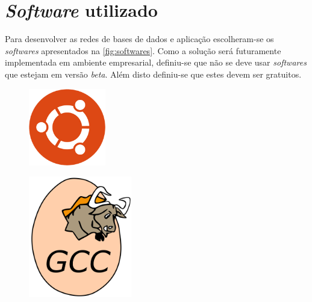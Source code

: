 \documentclass[11pt,twoside,a4paper]{report}
\begin{document}

\newpage
\section{\textit{Software} utilizado}
Para desenvolver as redes de bases de dados e aplicação escolheram-se os \textit{softwares} apresentados na \autoref{fig:softwares}. Como a solução será futuramente implementada em ambiente empresarial, definiu-se que não se deve usar \textit{softwares} que estejam em versão \textit{beta}. Além disto definiu-se que estes devem ser gratuitos.
\begin{figure}[H]
	\centering
	\begin{minipage}{0.33\textwidth}
		\vspace{0.88cm}
		\begin{center}
			\includegraphics[width=0.3\textwidth]{ubuntu} %
			\label{fig:linux}
		\end{center}
	\end{minipage}%
	\begin{minipage}{0.33\textwidth}
		\begin{center}
			\includegraphics[width=0.4\textwidth]{gcc} %
			\label{fig:gcc}
		\end{center}

\end{minipage}
\end{figure}
\end{document}
